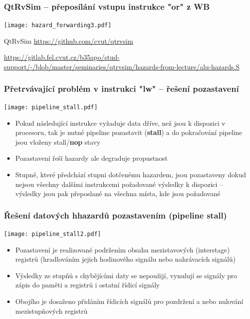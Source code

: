 \documentclass{beamer}
\begin{document}
\begin{frame}
\frametitle{QtRvSim -- přeposílání vstupu instrukce "or" z WB}
\texttt{[image: hazard\_forwarding3.pdf]}

{\tiny
QtRvSim \url{https://github.com/cvut/qtrvsim}
}

{\Tiny
\url{https://gitlab.fel.cvut.cz/b35apo/stud-support/-/blob/master/seminaries/qtrvsim/hazards-from-lecture/alu-hazards.S}
}

\end{frame}

\begin{frame}
\frametitle{Přetrvávající problém v instrukci "lw" -- řešení pozastavení}
\texttt{[image: pipeline\_stall.pdf]}

\begin{itemize}
 \item Pokud následující instrukce vyžaduje data dříve, než jsou k dispozici v procesoru, tak je nutné
       pipeline pozastavit (\textbf{stall}) a do pokračování pipeline jsou vloženy stall/\textbf{nop}
       stavy
 \item Pozastavení řeší hazardy ale degraduje propustnost
 \item Stupně, které předchází stupni dotčenému hazardem, jsou pozastaveny dokud nejsou všechny dalšími
       instrukcemi požadované výsledky k dispozici -- výsledky jsou pak přeposlané na všechna místa, kde
       jsou požadované
\end{itemize}

\end{frame}

\begin{frame}
\frametitle{Řešení datových hhazardů pozastavením (pipeline stall)}
\texttt{[image: pipeline\_stall2.pdf]}

\begin{itemize}
 \item Pozastavení je realizované podržením obsahu mezistavových (interstage) registrů
       (hradlováním jejich hodinového signálu nebo nahrávacích signálů)
 \item Výsledky ze stupňů s chybějícími daty se nepoužijí, vynulují se signály
       pro zápis do paměti a registrů i ostatní řídicí signály
 \item Obojího je dosaženo přidáním řídicích signálů pro pozdržení a nebo
       nulování mezistupňových registrů
\end{itemize}

\end{frame}
\end{document}
